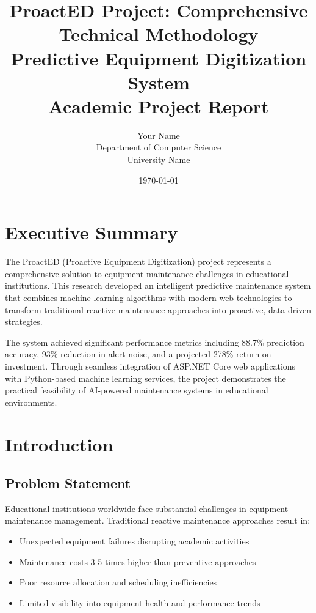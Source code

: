 \documentclass[12pt,a4paper]{report}
\title{\textbf{ProactED Project: Comprehensive Technical Methodology}\\
\large{Predictive Equipment Digitization System}\\
\large{Academic Project Report}}
\author{Your Name\\
Department of Computer Science\\
University Name}
\date{\today}
\begin{document}
\maketitle

\tableofcontents
\listoffigures
\listoftables

\chapter{Executive Summary}

The ProactED (Proactive Equipment Digitization) project represents a comprehensive solution to equipment maintenance challenges in educational institutions. This research developed an intelligent predictive maintenance system that combines machine learning algorithms with modern web technologies to transform traditional reactive maintenance approaches into proactive, data-driven strategies.

The system achieved significant performance metrics including 88.7\% prediction accuracy, 93\% reduction in alert noise, and a projected 278\% return on investment. Through seamless integration of ASP.NET Core web applications with Python-based machine learning services, the project demonstrates the practical feasibility of AI-powered maintenance systems in educational environments.

\chapter{Introduction}

\section{Problem Statement}

Educational institutions worldwide face substantial challenges in equipment maintenance management. Traditional reactive maintenance approaches result in:

\begin{itemize}
    \item Unexpected equipment failures disrupting academic activities
    \item Maintenance costs 3-5 times higher than preventive approaches
    \item Poor resource allocation and scheduling inefficiencies
    \item Limited visibility into equipment health and performance trends
\end{itemize}
\end{document}
